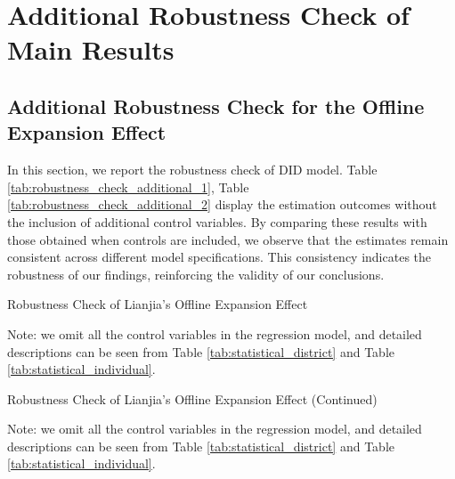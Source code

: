 \documentclass[11pt]{article}
\begin{document}
\newpage

\section{Additional Robustness Check of Main Results} \label{sec:additional_robustness}

\subsection{Additional Robustness Check for the Offline Expansion Effect} \label{subsec:expansion_effect}

In this section, we report the robustness check of DID model. Table \ref{tab:robustness_check_additional_1}, Table \ref{tab:robustness_check_additional_2} display the estimation outcomes without the inclusion of additional control variables. By comparing these results with those obtained when controls are included, we observe that the estimates remain consistent across different model specifications. This consistency indicates the robustness of our findings, reinforcing the validity of our conclusions.

\begin{table}[H]
  \begin{center}
    \begin{scriptsize}
      \caption{Robustness Check of Lianjia's Offline Expansion Effect}
      \label{tab:robustness_check_additional_1}
      
    
    Note: we omit all the control variables in the regression model, and detailed descriptions can be seen from Table \ref{tab:statistical_district} and Table \ref{tab:statistical_individual}.
    \end{scriptsize}
  \end{center}
\end{table}

\begin{table}[H]
  \begin{center}
    \begin{scriptsize}
      \caption{Robustness Check of Lianjia's Offline Expansion Effect (Continued)}
      \label{tab:robustness_check_additional_2}
      
    
    Note: we omit all the control variables in the regression model, and detailed descriptions can be seen from Table \ref{tab:statistical_district} and Table \ref{tab:statistical_individual}.
    \end{scriptsize}
  \end{center}
\end{table}
\end{document}
